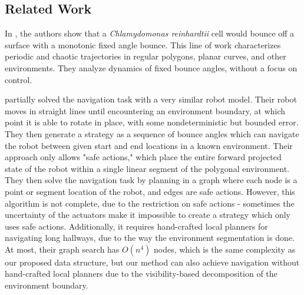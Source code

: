\documentclass[]{article}  %
\begin{document}
%    




\subsection{Related Work}

In \cite{microorganism2017}, the authors show that a
\textit{Chlamydomonas reinhardtii} cell would bounce off a surface with a
monotonic fixed angle bounce. This line of work characterizes periodic and
chaotic trajectories in regular polygons, planar curves, and other environments.
They analyze dynamics of fixed bounce angles, without a focus on control.

\cite{LewOKa13} partially solved the navigation task with a very similar robot
model. Their robot moves in straight lines until encountering an environment
boundary, at which point it is able to rotate in place, with some nondeterministic but
bounded error. They then generate a strategy as a sequence of bounce angles which can navigate the robot between given start and end locations in a known environment. Their approach only allows "safe actions," which place
the entire forward projected state of the robot within a single
linear segment of the polygonal environment. They then solve the navigation task by
planning in a graph where each node is a point or segment
location of the robot, and edges are safe actions. However, this algorithm is
not complete, due to the restriction on safe actions -
sometimes the uncertainty of the actuators make it impossible to create a
strategy which only uses safe actions. Additionally, it requires hand-crafted
local planners for navigating long hallways, due to the way the environment
segmentation is done. At most, their graph search has $O(n^4)$ nodes, which is
the same complexity as our proposed data structure, but our method can also
achieve navigation without hand-crafted local planners due to the
visibility-based decomposition of the environment boundary.
\end{document}
